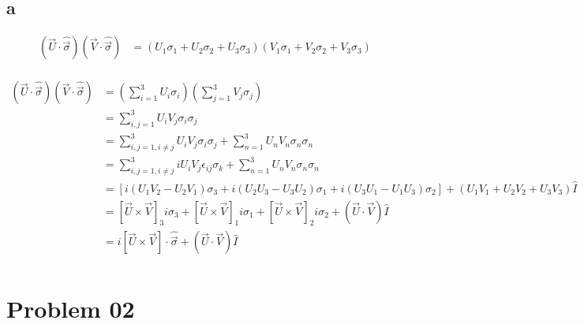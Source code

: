 \documentclass[letter]{article}
\begin{document}
\subsection*{a} 
\begin{align*}
	\left(\vec{U} \cdot  \hat{\vec{\sigma}}\right) 
	\left(\vec{V} \cdot  \hat{\vec{\sigma}}\right) &= 
	\left(U_1 \sigma_1 + U_2 \sigma_2 + U_3 \sigma_3\right)
	\left(V_1 \sigma_1 + V_2 \sigma_2 + V_3 \sigma_3\right)\\
\end{align*}

\begin{align*}
	\left(\vec{U} \cdot \hat{\vec{\sigma}}\right)
	\left(\vec{V}\cdot \hat{\vec{\sigma}}\right) &= 
	\left(\sum_{i= 1}^{3} U_i \sigma_i\right)
	\left(\sum_{j=1}^{3} V_j \sigma_j\right) \\
	&= 
\sum_{i,j = 1}^{3} U_i V_j \sigma_i \sigma_j
	\\
	&= 
\sum_{i,j = 1, i\neq j}^{3} U_i V_j \sigma_i \sigma_j + \sum_{n=1}^{3} U_n V_n \sigma_n \sigma_n 
	\\ 
	&= 
	\sum_{i,j = 1, i\neq j}^{3} i U_i V_j \epsilon_{ij} \sigma_k + \sum_{n=1}^{3} U_n V_n \sigma_n \sigma_n 
	\\ 
	&= \left[  i(U_1 V_2 - U_2 V_1) \sigma_3 + i (U_2 U_3 - U_3 U_2) \sigma_1 + i (U_3 U_1 - U_1 U_3) \sigma_2  \right] + (U_1 V_1 + U_2 V_2 + U_3 V_3) \hat{I} \\ 
	&= [ \vec{U} \times  \vec{V}]_3 i \sigma_3 + [ \vec{U} \times \vec{V}]_1 i \sigma_1 + 
	[\vec{U} \times  \vec{V}]_2 i \sigma_2 + (\vec{U} \cdot \vec{V}) \hat{I}\\
	&= i \left[ \vec{U} \times \vec{V}\right] \cdot \hat{\vec{\sigma}} + \left(\vec{U}\cdot \vec{V}\right) \hat{I} \\
\end{align*}



\newpage
\section*{Problem 02}
\end{document}
